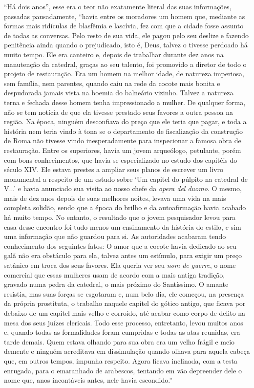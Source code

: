 ``Há dois anos'', esse era o teor não exatamente literal das suas
informações, passadas pausadamente, ``havia entre os moradores um homem
que, mediante as formas mais ridículas de blasfêmia e lascívia, fez com
que a cidade fosse assunto de todas as conversas. Pelo resto de sua
vida, ele pagou pelo seu deslize e fazendo penitência ainda quando o
prejudicado, isto é, Deus, talvez o tivesse perdoado há muito tempo. Ele
era canteiro e, depois de trabalhar durante dez anos na manutenção da
catedral, graças ao seu talento, foi promovido a diretor de todo o
projeto de restauração. Era um homem na melhor idade, de natureza
imperiosa, sem família, nem parentes, quando caiu na rede da cocote mais
bonita e despudorada jamais vista na boemia do balneário vizinho. Talvez
a natureza terna e fechada desse homem tenha impressionado a mulher. De
qualquer forma, não se tem notícia de que ela tivesse prestado seus
favores a outra pessoa na região. Na época, ninguém desconfiava do preço
que ele teria que pagar, e toda a história nem teria vindo à tona se o
departamento de fiscalização da construção de Roma não tivesse vindo
inesperadamente para inspecionar a famosa obra de restauração. Entre os
superiores, havia um jovem arqueólogo, petulante, porém com bons
conhecimentos, que havia se especializado no estudo dos capitéis do
século XIV. Ele estava prestes a ampliar seus planos de escrever um
livro monumental a respeito de um estudo sobre `Um capitel do púlpito na
catedral de V...' e havia anunciado sua visita ao nosso chefe da
\emph{opera del duomo}. O mesmo, mais de dez anos depois de suas
melhores noites, levava uma vida na mais completa solidão, sendo que a
época do brilho e da autoafirmação havia acabado há muito tempo. No
entanto, o resultado que o jovem pesquisador levou para casa desse
encontro foi tudo menos um ensinamento da história do estilo, e sim uma
informação que não guardou para si. As autoridades acabaram tendo
conhecimento dos seguintes fatos: O amor que a cocote havia dedicado ao
seu galã não era obstáculo para ela, talvez antes um estímulo, para
exigir um preço satânico em troca dos seus favores. Ela queria ver seu
\emph{nom de guerre}, o nome comercial que essas mulheres usam de acordo
com a mais antiga tradição, gravado numa pedra da catedral, o mais
próximo do Santíssimo. O amante resistia, mas suas forças se esgotaram
e, num belo dia, ele começou, na presença da própria prostituta, o
trabalho naquele capitel do gótico antigo, que ficava por debaixo de um
capitel mais velho e corroído, até acabar como corpo de delito na mesa
dos seus juízes clericais. Todo esse processo, entretanto, levou muitos
anos e, quando todas as formalidades foram cumpridas e todas as atas
reunidas, era tarde demais. Quem estava olhando para sua obra era um
velho frágil e meio demente e ninguém acreditava em dissimulação quando
olhava para aquela cabeça que, em outros tempos, impunha respeito. Agora
ficava inclinada, com a testa enrugada, para o emaranhado de arabescos,
tentando em vão depreender dele o nome que, anos incontáveis antes, nele
havia escondido.''

